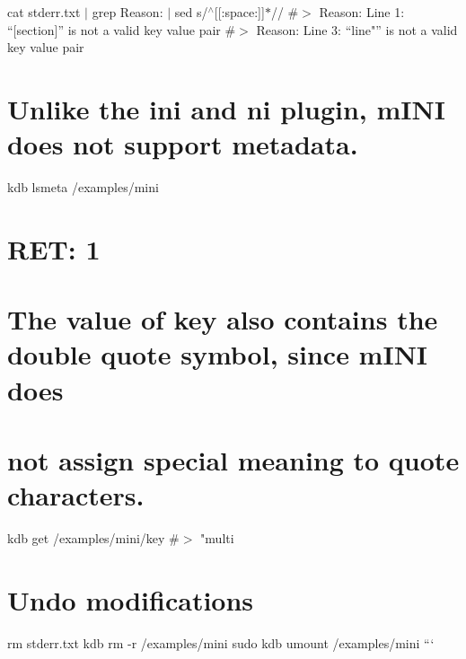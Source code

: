 cat stderr.\+txt $\vert$ grep \textquotesingle{}Reason\+:\textquotesingle{} $\vert$ sed \textquotesingle{}s/$^\wedge$\mbox{[}\mbox{[}\+:space\+:\mbox{]}\mbox{]}$\ast$//\textquotesingle{} \#$>$ Reason\+: Line 1\+: “\mbox{[}section\mbox{]}” is not a valid key value pair \#$>$ Reason\+: Line 3\+: “line"” is not a valid key value pair

\section*{Unlike the {\ttfamily ini} and {\ttfamily ni} plugin, m\+I\+NI does not support metadata.}

kdb lsmeta /examples/mini \section*{R\+ET\+: 1}

\section*{The value of {\ttfamily key} also contains the double quote symbol, since m\+I\+NI does}

\section*{not assign special meaning to quote characters.}

kdb get /examples/mini/key \#$>$ "multi

\section*{Undo modifications}

rm stderr.\+txt kdb rm -\/r /examples/mini sudo kdb umount /examples/mini ``` 